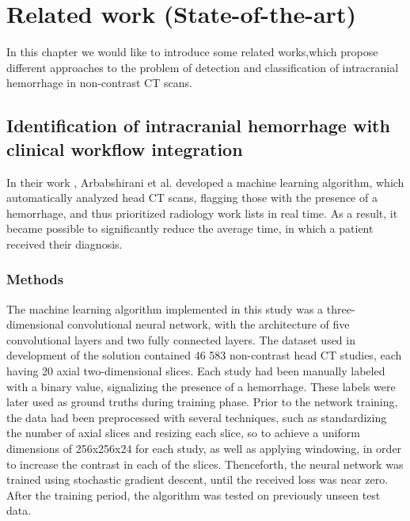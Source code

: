 \chapter{Related work (State-of-the-art)}
In this chapter we would like to introduce some related works,which propose different approaches to the problem of detection and classification of intracranial hemorrhage in non-contrast CT scans.

\section{Identification of intracranial hemorrhage with clinical workflow integration}
In their work \cite{relatedWork1}, Arbabshirani et al. developed a machine learning algorithm, which automatically analyzed head CT scans, flagging those with the presence of a hemorrhage, and thus prioritized radiology work lists in real time. As a result, it became possible to significantly reduce the average time, in which a patient received their diagnosis.  
\subsection*{Methods} 
The machine learning algorithm implemented in this study was a three-dimensional convolutional neural network, with the architecture of five convolutional layers and two fully connected layers. The dataset used in development of the solution contained 46 583 non-contrast head CT studies, each having 20 axial two-dimensional slices. Each study had been manually labeled with a binary value, signalizing the presence of a hemorrhage. These labels were later used as ground truths during training phase. Prior to the network training, the data had been preprocessed with several techniques, such as standardizing the number of axial slices and resizing each slice, so to achieve a uniform dimensions of 256x256x24 for each study, as well as applying windowing, in order to increase the contrast in each of the slices. Thenceforth, the neural network was trained using stochastic gradient descent, until the received loss was near zero. After the training period, the algorithm was tested on previously unseen test data.
